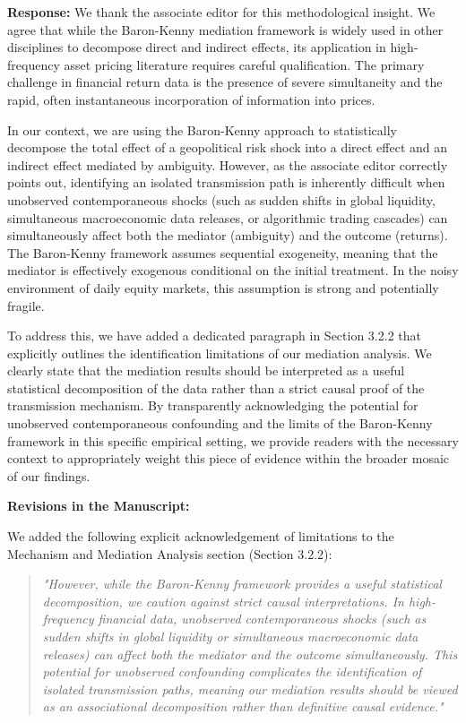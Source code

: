 \documentclass[12pt]{article}
\begin{document}
\begin{highlightbox}
\textbf{Response:} We thank the associate editor for this methodological insight. We agree that while the Baron-Kenny mediation framework is widely used in other disciplines to decompose direct and indirect effects, its application in high-frequency asset pricing literature requires careful qualification. The primary challenge in financial return data is the presence of severe simultaneity and the rapid, often instantaneous incorporation of information into prices. 

In our context, we are using the Baron-Kenny approach to statistically decompose the total effect of a geopolitical risk shock into a direct effect and an indirect effect mediated by ambiguity. However, as the associate editor correctly points out, identifying an isolated transmission path is inherently difficult when unobserved contemporaneous shocks (such as sudden shifts in global liquidity, simultaneous macroeconomic data releases, or algorithmic trading cascades) can simultaneously affect both the mediator (ambiguity) and the outcome (returns). The Baron-Kenny framework assumes sequential exogeneity, meaning that the mediator is effectively exogenous conditional on the initial treatment. In the noisy environment of daily equity markets, this assumption is strong and potentially fragile.

To address this, we have added a dedicated paragraph in Section 3.2.2 that explicitly outlines the identification limitations of our mediation analysis. We clearly state that the mediation results should be interpreted as a useful statistical decomposition of the data rather than a strict causal proof of the transmission mechanism. By transparently acknowledging the potential for unobserved contemporaneous confounding and the limits of the Baron-Kenny framework in this specific empirical setting, we provide readers with the necessary context to appropriately weight this piece of evidence within the broader mosaic of our findings.
\end{highlightbox}

\begin{highlightbox}
\textbf{Revisions in the Manuscript:}

We added the following explicit acknowledgement of limitations to the Mechanism and Mediation Analysis section (Section 3.2.2):
\vspace{0.2cm}
\begin{quote}
\color{red}\itshape "However, while the Baron-Kenny framework provides a useful statistical decomposition, we caution against strict causal interpretations. In high- \\
\color{red}\itshape frequency financial data, unobserved contemporaneous shocks (such as sudden shifts in global liquidity or simultaneous macroeconomic data releases) can affect both the mediator and the outcome simultaneously. This potential for unobserved confounding complicates the identification of isolated transmission paths, meaning our mediation results should be viewed as an associational decomposition rather than definitive causal evidence."
\end{quote}
\end{highlightbox}
\end{document}
